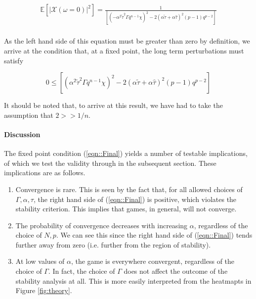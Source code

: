 \documentclass[sigconf,anonymous]{aamas}
\newcommand{\ttau}{\tilde{\tau}}
\newcommand{\htau}{\hat{\tau}}
\begin{document}
\begin{equation}
\begin{split}
        \mathbb{E}[|\mathcal{X}(\omega = 0)|^2] = \frac{1}{\left[ (-\alpha^2 \ttau^2 \Gamma q^{n-1} \chi)^2 - 2 (\alpha \ttau + \alpha \htau)^2 (p-1)q^{p-2}\right]} \\
\end{split}
\end{equation}

As the left hand side of this equation must be greater than zero by definition, we arrive at the condition that, at a fixed point, the long term perturbations must satisfy

\begin{equation}
    \label{eqn::Final}
    0 \leq \left [(\alpha^2 \ttau^2 \Gamma q^{n-1} \chi)^{2} - 2 (\alpha \ttau + \alpha \htau)^2 (p-1)q^{p-2} \right ]
\end{equation}

It should be noted that, to arrive at this result, we have had to take the assumption that $2 >> 1/n$. 


\paragraph{Discussion}
The fixed point condition (\ref{eqn::Final}) yields a number of testable implications, of which we test the validity through in the subsequent section. These implications are as follows.

\begin{enumerate}
    \item Convergence is rare. This is seen by the fact that, for all allowed choices of $\Gamma, \alpha, \tau$, the right hand side of (\ref{eqn::Final}) is positive, which violates the stability criterion. This implies that games, in general, will not converge.
    \item The probability of convergence decreases with increasing $\alpha$, regardless of the choice of $N, p$. We can see this since the right hand side of (\ref{eqn::Final}) tends further away from zero (i.e. further from the region of stability).
    \item At low values of $\alpha$, the game is everywhere convergent, regardless of the choice of $\Gamma$. In fact, the choice of $\Gamma$ does not affect the outcome of the stability analysis at all. This is more easily interpreted from the heatmapts in Figure \ref{fig:theory}.
\end{enumerate}
\end{document}
